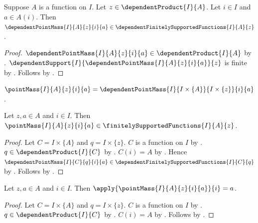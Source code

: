 \begin{proposition}\label{spike_dependent_point_mass_finitely_supported}
    Suppose $A$ is a function on $I$.
    Let $z\in\dependentProduct{I}{A}$.
    Let $i\in I$ and $a\in A(i)$.
    Then
        $\dependentPointMass{I}{A}{z}{i}{a}
            \in\dependentFinitelySupportedFunctions{I}{A}{z}$.
\end{proposition}
\begin{proof}
    $\dependentPointMass{I}{A}{z}{i}{a}
        \in\dependentProduct{I}{A}$ by
        .
    $\dependentSupport{I}{
        \dependentPointMass{I}{A}{z}{i}{a}}{z}$ is finite by
        .
    Follows by
        .
\end{proof}

\begin{definition}\label{spike_point_mass}
    $\pointMass{I}{A}{z}{i}{a}
        =\dependentPointMass
            {I}{I\times\{A\}}{I\times\{z\}}{i}{a}$.
\end{definition}

\begin{proposition}\label{spike_point_mass_finitely_supported}
    Let $z,a\in A$ and $i\in I$.
    Then
        $\pointMass{I}{A}{z}{i}{a}
            \in\finitelySupportedFunctions{I}{A}{z}$.
\end{proposition}
\begin{proof}
    Let $C=I\times\{A\}$ and $q=I\times\{z\}$.
    $C$ is a function on $I$ by
        .
    $q\in\dependentProduct{I}{C}$ by
        .
    $C(i)=A$ by .
    Hence
        $\dependentPointMass{I}{C}{q}{i}{a}
            \in\dependentFinitelySupportedFunctions{I}{C}{q}$ by
        .
    Follows by
        .
\end{proof}

\begin{proposition}\label{spike_point_mass_selected}
    Let $z,a\in A$ and $i\in I$.
    Then $\apply{\pointMass{I}{A}{z}{i}{a}}{i}=a$.
\end{proposition}
\begin{proof}
    Let $C=I\times\{A\}$ and $q=I\times\{z\}$.
    $C$ is a function on $I$ by
        .
    $q\in\dependentProduct{I}{C}$ by
        .
    $C(i)=A$ by .
    Follows by
        .
\end{proof}

